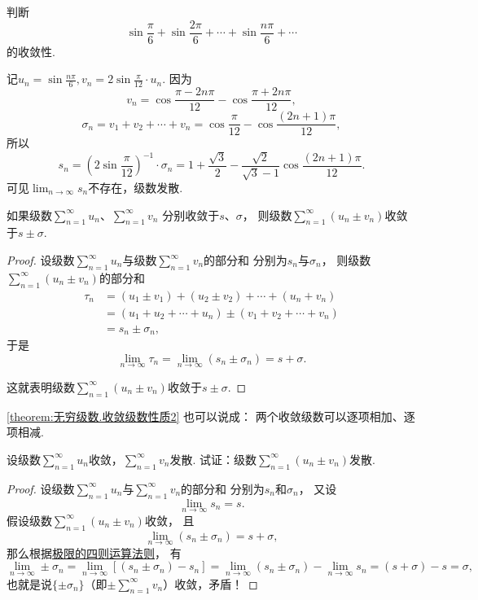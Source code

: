\begin{example}
判断\[
\sin\frac{\pi}{6}+\sin\frac{2\pi}{6}+\dotsb+\sin\frac{n\pi}{6}+\dotsb
\]的收敛性.
\begin{solution}
记\(u_n = \sin\frac{n\pi}{6},
v_n = 2\sin\frac{\pi}{12} \cdot u_n\).
因为\[
	v_n = \cos\frac{\pi-2n\pi}{12} - \cos\frac{\pi+2n\pi}{12},
\]\[
	\sigma_n
	= v_1 + v_2 + \dotsb + v_n
	= \cos\frac{\pi}{12} - \cos\frac{(2n+1)\pi}{12},
\]
所以\[
	s_n
	= \left(2\sin\frac{\pi}{12}\right)^{-1} \cdot \sigma_n
	= 1+\frac{\sqrt{3}}{2} - \frac{\sqrt{2}}{\sqrt{3}-1} \cos\frac{(2n+1)\pi}{12}.
\]
可见\(\lim_{n\to\infty} s_n\)不存在，级数发散.
\end{solution}
\end{example}

\begin{property}\label{theorem:无穷级数.收敛级数性质2}
如果级数\(\sum_{n=1}^\infty u_n\)、\(\sum_{n=1}^\infty v_n\)
分别收敛于\(s\)、\(\sigma\)，
则级数\(\sum_{n=1}^\infty(u_n \pm v_n)\)收敛于\(s \pm \sigma\).
\begin{proof}
设级数\(\sum_{n=1}^\infty u_n\)与级数\(\sum_{n=1}^\infty v_n\)的部分和
分别为\(s_n\)与\(\sigma_n\)，
则级数\(\sum_{n=1}^\infty(u_n \pm v_n)\)的部分和\begin{align*}
	\tau_n &= (u_1 \pm v_1) + (u_2 \pm v_2) + \dotsb + (u_n + v_n) \\
	&= (u_1 + u_2 + \dotsb + u_n) \pm (v_1 + v_2 + \dotsb + v_n) \\
	&= s_n \pm \sigma_n,
\end{align*}
于是\[
	\lim_{n\to\infty} \tau_n
	= \lim_{n\to\infty} (s_n \pm \sigma_n)
	= s + \sigma.
\]

这就表明级数\(\sum_{n=1}^\infty(u_n \pm v_n)\)收敛于\(s \pm \sigma\).
\end{proof}
\end{property}
\cref{theorem:无穷级数.收敛级数性质2} 也可以说成：
{\color{red}两个收敛级数可以逐项相加、逐项相减.}

\begin{example}
设级数\(\sum_{n=1}^\infty u_n\)收敛，\(\sum_{n=1}^\infty v_n\)发散.
试证：级数\(\sum_{n=1}^\infty (u_n \pm v_n)\)发散.
\begin{proof}
设级数\(\sum_{n=1}^\infty u_n\)与\(\sum_{n=1}^\infty v_n\)的部分和
分别为\(s_n\)和\(\sigma_n\)，
又设\[
	\lim_{n\to\infty} s_n = s.
\]
假设级数\(\sum_{n=1}^\infty (u_n \pm v_n)\)收敛，
且\[
	\lim_{n\to\infty} (s_n \pm \sigma_n) = s+\sigma,
\]
那么根据\hyperref[theorem:极限.极限的四则运算法则]{极限的四则运算法则}，
有\[
	\lim_{n\to\infty} \pm\sigma_n
	= \lim_{n\to\infty} [(s_n \pm \sigma_n) - s_n]
	= \lim_{n\to\infty} (s_n \pm \sigma_n) - \lim_{n\to\infty} s_n
	= (s + \sigma) - s
	= \sigma,
\]
也就是说\(\{\pm\sigma_n\}\)（即\(\pm\sum_{n=1}^\infty v_n\)）收敛，矛盾！
\end{proof}
\end{example}

